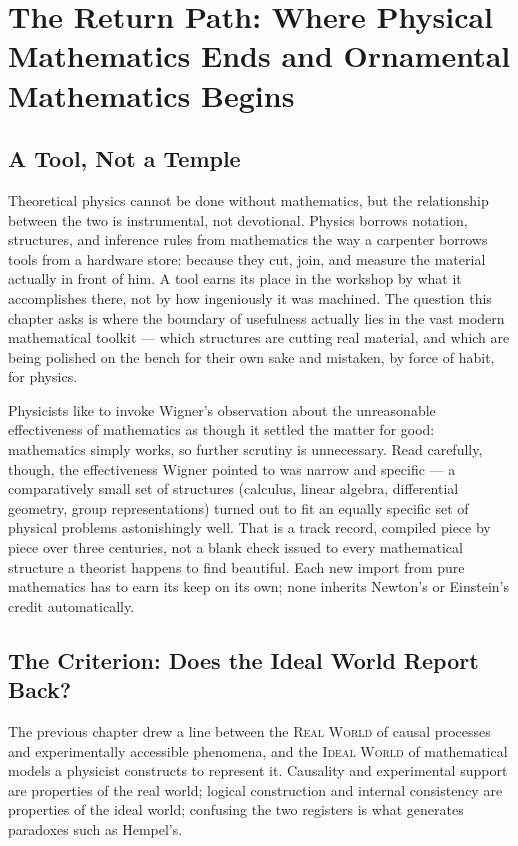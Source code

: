 \documentclass[11pt]{book}
\newcommand{\RW}{\textsc{Real World}}
\newcommand{\IW}{\textsc{Ideal World}}
\begin{document}
\pagestyle{plain}

\chapter[The Return Path]{The Return Path: Where Physical Mathematics Ends and Ornamental Mathematics Begins}
\label{ch:return-path}

\section{A Tool, Not a Temple}

Theoretical physics cannot be done without mathematics, but the relationship between the two is instrumental, not devotional. Physics borrows notation, structures, and inference rules from mathematics the way a carpenter borrows tools from a hardware store: because they cut, join, and measure the material actually in front of him. A tool earns its place in the workshop by what it accomplishes there, not by how ingeniously it was machined. The question this chapter asks is where the boundary of usefulness actually lies in the vast modern mathematical toolkit --- which structures are cutting real material, and which are being polished on the bench for their own sake and mistaken, by force of habit, for physics.

Physicists like to invoke Wigner's observation about the unreasonable effectiveness of mathematics as though it settled the matter for good: mathematics simply works, so further scrutiny is unnecessary. Read carefully, though, the effectiveness Wigner pointed to was narrow and specific --- a comparatively small set of structures (calculus, linear algebra, differential geometry, group representations) turned out to fit an equally specific set of physical problems astonishingly well. That is a track record, compiled piece by piece over three centuries, not a blank check issued to every mathematical structure a theorist happens to find beautiful. Each new import from pure mathematics has to earn its keep on its own; none inherits Newton's or Einstein's credit automatically.

\section{The Criterion: Does the Ideal World Report Back?}

The previous chapter drew a line between the \RW{} of causal processes and experimentally accessible phenomena, and the \IW{} of mathematical models a physicist constructs to represent it. Causality and experimental support are properties of the real world; logical construction and internal consistency are properties of the ideal world; confusing the two registers is what generates paradoxes such as Hempel's.
\end{document}
